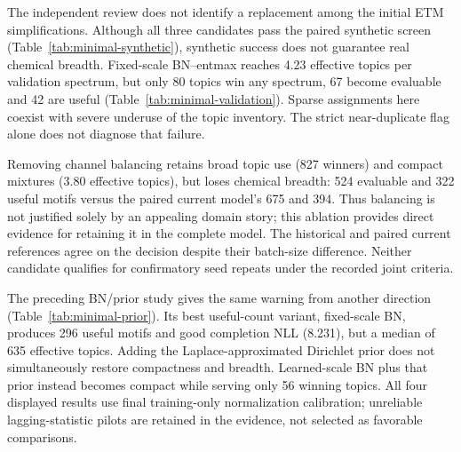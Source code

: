 \documentclass[10pt,a4paper]{article}
\begin{document}
The independent review does not identify a replacement among the initial
ETM simplifications. Although all three candidates pass the paired synthetic
screen (Table~\ref{tab:minimal-synthetic}), synthetic success does not guarantee
real chemical breadth. Fixed-scale BN--entmax reaches 4.23 effective topics
per validation spectrum, but only 80 topics win any spectrum, 67 become
evaluable and 42 are useful (Table~\ref{tab:minimal-validation}). Sparse
assignments here coexist with severe underuse of the topic inventory.
The strict near-duplicate flag alone does not diagnose that failure.

Removing channel balancing retains broad topic use (827 winners) and compact
mixtures (3.80 effective topics), but loses chemical breadth: 524 evaluable
and 322 useful motifs versus the paired current model's 675 and 394.
Thus balancing is not justified solely by an appealing domain story; this
ablation provides direct evidence for retaining it in the complete model.
The historical and paired current references agree on the decision despite
their batch-size difference. Neither candidate qualifies for confirmatory
seed repeats under the recorded joint criteria.

\begin{table}[htbp]
\centering
\small
\setlength{\tabcolsep}{4pt}
\caption{Validation-only initial simplification review, $K=1000$.
Useful means SOS at least 0.6; mean SOS is conditional on evaluability.
NLL is completion negative log-likelihood per in-vocabulary token; effective
topics are the median exponentiated mixture entropy; winners count topics
with at least one dominant assignment. Historical neural references use batch
256; the three new rows use batch 200 with matched seed 7043. Dashes are
unreported historical diagnostics, not zeros. No new test evaluation occurs.}
\label{tab:minimal-validation}
\end{table}

The preceding BN/prior study gives the same warning from another direction
(Table~\ref{tab:minimal-prior}). Its best useful-count variant, fixed-scale BN,
produces 296 useful motifs and good completion NLL (8.231), but a median of
635 effective topics. Adding the Laplace-approximated Dirichlet prior does
not simultaneously restore compactness and breadth. Learned-scale BN plus
that prior instead becomes compact while serving only 56 winning topics.
All four displayed results use final training-only normalization calibration;
unreliable lagging-statistic pilots are retained in the evidence, not selected
as favorable comparisons.
\end{document}

